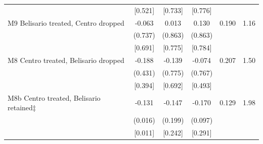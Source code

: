 \begin{table}[htbp]
\begin{threeparttable}
\begin{tabular}{lccccc}
 & [0.521] & [0.733] & [0.776] &  &  \\
M9 Belisario treated, Centro dropped & -0.063 & 0.013 & 0.130 & 0.190 & 1.16 \\
 & (0.737) & (0.863) & (0.863) &  &  \\
 & [0.691] & [0.775] & [0.784] &  &  \\
M8 Centro treated, Belisario dropped & -0.188 & -0.139 & -0.074 & 0.207 & 1.50 \\
 & (0.431) & (0.775) & (0.767) &  &  \\
 & [0.394] & [0.692] & [0.493] &  &  \\
M8b Centro treated, Belisario retained‡ & -0.131 & -0.147 & -0.170 & 0.129 & 1.98 \\
 & (0.016) & (0.199) & (0.097) &  &  \\
 & [0.011] & [0.242] & [0.291] &  &  \\
\bottomrule
\end{tabular}
\begin{tablenotes}\footnotesize

\end{tablenotes}
\end{threeparttable}
\end{table}
